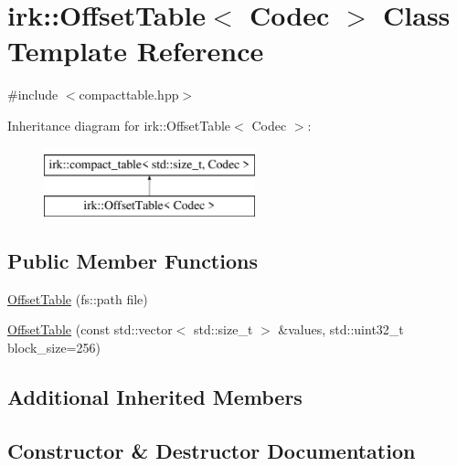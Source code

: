 \hypertarget{classirk_1_1OffsetTable}{}\section{irk\+:\+:Offset\+Table$<$ Codec $>$ Class Template Reference}
\label{classirk_1_1OffsetTable}


{\ttfamily \#include $<$compacttable.\+hpp$>$}

Inheritance diagram for irk\+:\+:Offset\+Table$<$ Codec $>$\+:\begin{figure}[H]
\begin{center}
\leavevmode
\includegraphics[height=2.000000cm]{classirk_1_1OffsetTable}
\end{center}
\end{figure}
\subsection*{Public Member Functions}
\begin{DoxyCompactItemize}
\item 
\mbox{\hyperlink{classirk_1_1OffsetTable_a3a7ebaf1dee77cca247d2db8319e18a4}{Offset\+Table}} (fs\+::path file)
\item 
\mbox{\hyperlink{classirk_1_1OffsetTable_a5d874761d8bc70f468fe9df4f3d50cad}{Offset\+Table}} (const std\+::vector$<$ std\+::size\+\_\+t $>$ \&values, std\+::uint32\+\_\+t block\+\_\+size=256)
\end{DoxyCompactItemize}
\subsection*{Additional Inherited Members}


\subsection{Constructor \& Destructor Documentation}
\mbox{\label{classirk_1_1OffsetTable_a3a7ebaf1dee77cca247d2db8319e18a4}} 
